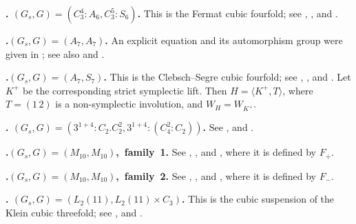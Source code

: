 \documentclass[12pt]{amsart}
\numberwithin{equation}{section}
\theoremstyle{plain}
\theoremstyle{definition}
\theoremstyle{remark}
\begin{document}
\par{}\medskip\noindent\textbf{.\enspace
$(G_s,G)=(C_3^4:A_6,C_3^5:S_6)$.}\label{fam:fourfold-no-1}
This is the Fermat cubic fourfold; see
\cite[Theorem~1.8(1)]{laza2022automorphisms},
\cite[\S6.1, (1)]{yang2024automorphism}, and
\cite[\S8(i), (8.1)]{KOIKE202512}.

\par{}\medskip\noindent\textbf{.\enspace $(G_s,G)=(A_7,A_7)$.}\label{fam:fourfold-no-2}
An explicit equation and its automorphism
group were given in \cite[Theorem~6.14]{yang2024automorphism}; see also
\cite[\S8(ii), (2.3)]{KOIKE202512} and
\cite[Theorem~1.2(6)]{he2025cubicfourfoldsorder7automorphism}.

\par{}\medskip\noindent\textbf{.\enspace $(G_s,G)=(A_7,S_7)$.}\label{fam:fourfold-no-3}
This is the Clebsch--Segre cubic fourfold; see \cite[\S6.1, (11)]{yang2024automorphism},
\cite[\S8(ii), (2.1)]{KOIKE202512}, and
\cite[Theorem~1.2(7)]{he2025cubicfourfoldsorder7automorphism}.
Let $K^+$ be the corresponding strict symplectic lift.  Then
$H=\langle K^+,T\rangle$, where $T=(1\,2)$ is a non-symplectic
involution, and $W_H=W_{K^+}$.

\par{}\medskip\noindent\textbf{.\enspace
$(G_s,G)=(3^{1+4}:C_2.C_2^2,3^{1+4}:(C_4^2:C_2))$.}\label{fam:fourfold-no-4}
See \cite[Theorem~1.8(3)]{laza2022automorphisms}, \cite[\S6.1, (7)]{yang2024automorphism} and
\cite[\S8(iii), (8.2)--(8.3)]{KOIKE202512}.

\par{}\medskip\noindent\mbox{\textbf{.\enspace $(G_s,G)=(M_{10},M_{10})$, family~1.}}\label{fam:fourfold-no-5}
See
\cite[Theorem~1.8(4)]{laza2022automorphisms},
\cite[\S6.1, (10)]{yang2024automorphism}, and
\cite[\S8(vi), (8.6)]{KOIKE202512},
where it is defined by $F_+$.

\par{}\medskip\noindent\mbox{\textbf{.\enspace $(G_s,G)=(M_{10},M_{10})$, family~2.}}\label{fam:fourfold-no-6}
See
\cite[Theorem~1.8(4)]{laza2022automorphisms},
\cite[Theorem~6.15]{yang2024automorphism}, and
\cite[\S8(vi), (8.6)]{KOIKE202512},
where it is defined by $F_-$.

\par{}\medskip\noindent\textbf{.\enspace
$(G_s,G)=(L_2(11),L_2(11)\times C_3)$.}\label{fam:fourfold-no-7}
This is the cubic suspension of the Klein cubic threefold; see \cite[Theorem~1.8(5)]{laza2022automorphisms}, \cite[\S6.1, (6)]{yang2024automorphism} and
\cite[\S8(iv), (8.4)]{KOIKE202512}.
\end{document}
